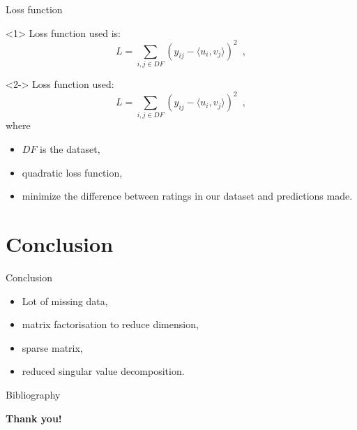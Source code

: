 \documentclass[unknownkeysallowed]{beamer}
\begin{document}
\begin{frame}{Loss function}
\begin{onlyenv}<1>
    Loss function used is:
    $$L=\sum_{i,j \in DF} (y_{ij} - \langle u_i,v_j\rangle  )^2 \enspace,$$
\end{onlyenv}
\begin{onlyenv}<2->
    Loss function used:
    $$L=\sum_{i,j \in DF} (y_{ij} - \langle u_i,v_j\rangle  )^2 \enspace, $$
    where
    \begin{itemize}
        \item $DF$ is the dataset,
        \item quadratic loss function,
        \item minimize the difference between ratings in our dataset and predictions made.
    \end{itemize}
\end{onlyenv}
\end{frame}

\section{Conclusion}

\begin{frame}{Conclusion}
\begin{itemize}
    \item Lot of missing data,
    \item matrix factorisation to reduce dimension,
    \item sparse matrix,
    \item reduced singular value decomposition.
\end{itemize}
\end{frame}

\begin{frame}{Bibliography}
\nocite{*}
\printbibliography
\end{frame}

\addtocounter{framenumber}{-1}
\begin{frame}[plain]{}
\begin{center}
    \LARGE\color{marron}
\textbf{Thank you!}
\end{center}
\end{frame}
\end{document}
